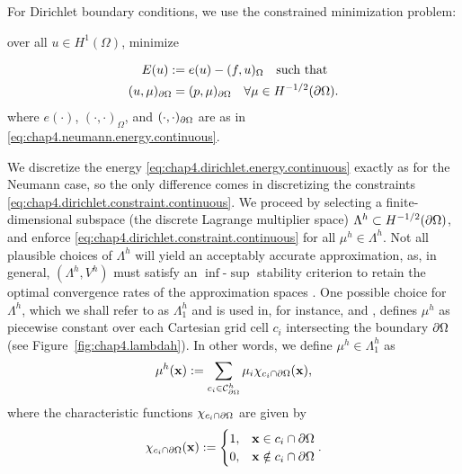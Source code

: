 For Dirichlet boundary conditions, we use the constrained minimization problem:
\begin{center}
over all $u \in H^1(\Omega)$, minimize
\end{center}
\begin{align}
E(u) := {} & e(u) - (f,u)_{\Omega} \label{eq:chap4.dirichlet.energy.continuous} \quad \text{such that}  \\
(u,\mu)_{\partial\Omega} = {} & (p,\mu)_{\partial\Omega} \quad \forall \mu \in H^{-1/2}(\partial\Omega). \label{eq:chap4.dirichlet.constraint.continuous}
\end{align}
where $e(\cdot)$, $(\cdot,\cdot)_{\Omega}$, and $(\cdot,\cdot)_{\partial\Omega}$ are as in \eqref{eq:chap4.neumann.energy.continuous}.

We discretize the energy \eqref{eq:chap4.dirichlet.energy.continuous} exactly as for the Neumann case, so the only difference comes in discretizing the constraints \eqref{eq:chap4.dirichlet.constraint.continuous}. We proceed by selecting a finite-dimensional subspace (the discrete Lagrange multiplier space) $\Lambda^h \subset H^{-1/2}(\partial\Omega)$, and enforce \eqref{eq:chap4.dirichlet.constraint.continuous} for all $\mu^h \in \Lambda^h$. Not all plausible choices of $\Lambda^h$ will yield an acceptably accurate approximation, as, in general, $(\Lambda^h, V^h)$ must satisfy an $\inf$-$\sup$ stability criterion to retain the optimal convergence rates of the approximation spaces \cite{Pitkaranta79}. One possible choice for $\Lambda^h$, which we shall refer to as $\Lambda^h_1$ and is used in, for instance, \cite{Vaughan06} and \cite{Mourad07}, defines $\mu^h$ as piecewise constant over each Cartesian grid cell $c_i$ intersecting the boundary $\partial\Omega$ (see Figure~\ref{fig:chap4.lambdah}). In other words, we define $\mu^h \in \Lambda^h_1$ as
\begin{equation*}
\mu^h(\mathbf{x}) := \sum_{c_i \in \mathcal{C}^h_{\partial\Omega}} \mu_i \chi_{c_i \cap \partial\Omega}(\mathbf{x}),
\end{equation*}
where the characteristic functions $\chi_{c_i \cap \partial\Omega}$ are given by
\begin{equation} \label{eq:chap4.lambdah1.basis}
\chi_{c_i \cap \partial\Omega}(\mathbf{x}) := \begin{cases} 1, & \mathbf{x} \in c_i \cap \partial\Omega \\ 0, & \mathbf{x} \notin c_i \cap \partial\Omega \end{cases}.
\end{equation}

